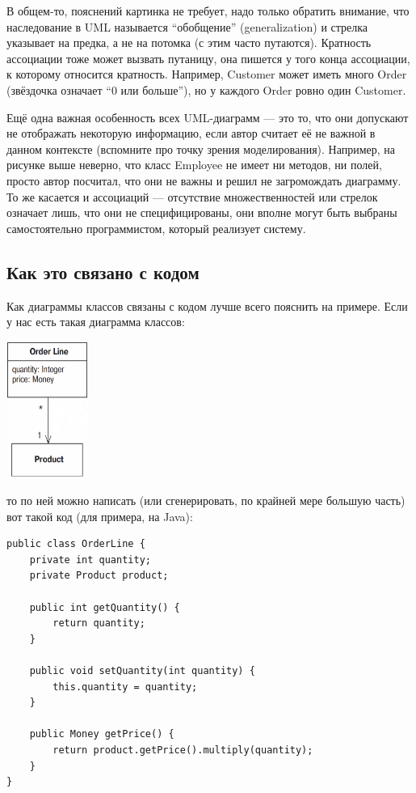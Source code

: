 \documentclass[a5paper]{article}
\begin{document}
В общем-то, пояснений картинка не требует, надо только обратить внимание, что наследование в UML называется ``обобщение'' (generalization) и стрелка указывает на предка, а не на потомка (с этим часто путаются). Кратность ассоциации тоже может вызвать путаницу, она пишется у того конца ассоциации, к которому относится кратность. Например, Customer может иметь много Order (звёздочка означает ``0 или больше''), но у каждого Order ровно один Customer. 

Ещё одна важная особенность всех UML-диаграмм --- это то, что они допускают не отображать некоторую информацию, если автор считает её не важной в данном контексте (вспомните про точку зрения моделирования). Например, на рисунке выше неверно, что класс Employee не имеет ни методов, ни полей, просто автор посчитал, что они не важны и решил не загромождать диаграмму. То же касается и ассоциаций --- отсутствие множественностей или стрелок означает лишь, что они не специфицированы, они вполне могут быть выбраны самостоятельно программистом, который реализует систему.

\subsection{Как это связано с кодом}

Как диаграммы классов связаны с кодом лучше всего пояснить на примере. Если у нас есть такая диаграмма классов:

\begin{center}
	\includegraphics[width=0.2\textwidth]{orderLine.png}
\end{center}

то по ней можно написать (или сгенерировать, по крайней мере большую часть) вот такой код (для примера, на Java):

\begin{verbatim}
public class OrderLine {
    private int quantity;
    private Product product;

    public int getQuantity() {
        return quantity;
    }

    public void setQuantity(int quantity) {
        this.quantity = quantity;
    }

    public Money getPrice() {
        return product.getPrice().multiply(quantity);
    }
}
\end{verbatim}
\end{document}
